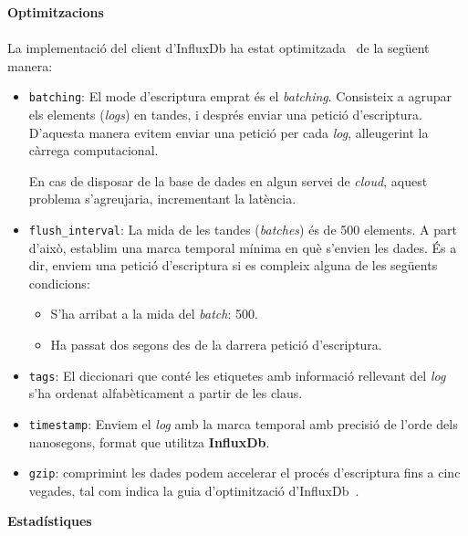 \clearpage

\noindent
\textbf{Optimitzacions} \\ \\

\noindent
La implementació del client d'InfluxDb ha estat optimitzada~\cite{influxdb:optimizations} de la següent manera:

\begin{itemize}
    \item \texttt{batching}: El mode d'escriptura emprat és el \textit{batching}.
    Consisteix a agrupar els elements (\textit{\gls{log}s}) en tandes, i després enviar una petició d'escriptura.
    D'aquesta manera evitem enviar una petició per cada \textit{log}, alleugerint la càrrega computacional.
    \begin{tcolorbox}[colback=red!5!white, colframe=red!75!black, title=Sobrecàrrega]
    En cas de disposar de la base de dades en algun servei de \textit{cloud}, aquest problema s'agreujaria, incrementant la latència.
    \end{tcolorbox}
    \item \texttt{flush\_interval}: La mida de les tandes (\textit{batches}) és de 500 elements.
    A part d’això, establim una marca temporal mínima en què s’envien les dades.
    És a dir, enviem una petició d’escriptura si es compleix alguna de les següents condicions:
    \begin{itemize}
        \item S’ha arribat a la mida del \textit{batch}: 500.
        \item Ha passat dos segons des de la darrera petició d’escriptura.
    \end{itemize}
    \item \texttt{tags}: El diccionari que conté les etiquetes amb informació rellevant del \textit{\gls{log}} s’ha ordenat alfabèticament a partir de les claus.
    \item \texttt{\gls{timestamp}}: Enviem el \textit{\gls{log}} amb la marca temporal amb precisió de l’orde dels nanosegons, format que utilitza \textbf{InfluxDb}.
    \item \texttt{\gls{gzip}}: comprimint les dades podem accelerar el procés d’escriptura fins a cinc vegades, tal com indica la guia d'optimització d'InfluxDb~\cite{influxdb:optimizations}.
\end{itemize}

\clearpage

\noindent
\textbf{Estadístiques} \\ \\

